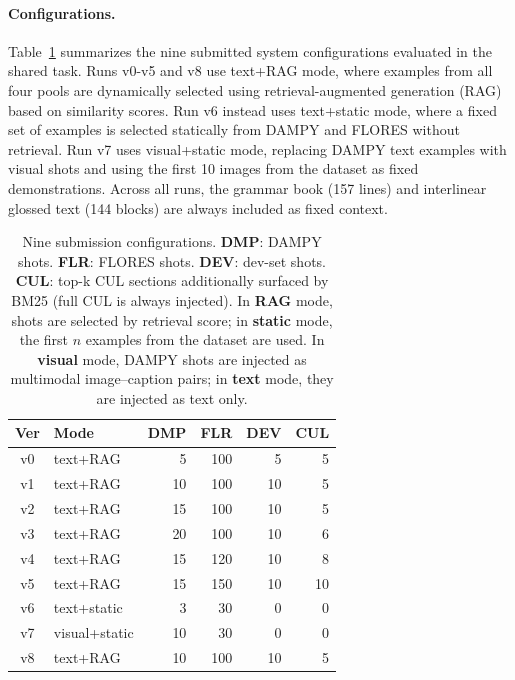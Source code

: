 \documentclass[11pt]{article}
\begin{document}
\paragraph{Configurations.}
Table~\ref{tab:configs} summarizes the nine submitted system configurations evaluated in the shared task. Runs v0-v5 and v8 use text+RAG mode, where examples from all four pools are dynamically selected using retrieval-augmented generation (RAG) based on similarity scores. Run v6 instead uses text+static mode, where a fixed set of examples is selected statically from DAMPY and FLORES without retrieval. Run v7 uses visual+static mode, replacing DAMPY text examples with visual shots and using the first 10 images from the dataset as fixed demonstrations. Across all runs, the grammar book (157 lines) and interlinear glossed text (144 blocks) are always included as fixed context.

\begin{table}[t]
\centering
\small
\setlength{\tabcolsep}{3pt}
\begin{tabular}{clrrrr}
\toprule
\textbf{Ver} & \textbf{Mode} & \textbf{DMP} & \textbf{FLR} & \textbf{DEV} & \textbf{CUL} \\
\midrule
v0 & text+RAG   &  5 & 100 &  5 &  5 \\
v1 & text+RAG   & 10 & 100 & 10 &  5 \\
v2 & text+RAG   & 15 & 100 & 10 &  5 \\
v3 & text+RAG   & 20 & 100 & 10 &  6 \\
v4 & text+RAG   & 15 & 120 & 10 &  8 \\
v5 & text+RAG   & 15 & 150 & 10 & 10 \\
v6 & text+static &  3 &  30 &  0 &  0 \\
v7 & visual+static & 10 & 30 & 0 & 0 \\
v8 & text+RAG   & 10 & 100 & 10 &  5 \\
\bottomrule
\end{tabular}
\caption{Nine submission configurations.
  \textbf{DMP}: DAMPY shots. \textbf{FLR}: FLORES shots.
  \textbf{DEV}: dev-set shots. \textbf{CUL}: top-k CUL sections additionally surfaced by BM25 (full CUL is always injected).
  In \textbf{RAG} mode, shots are selected by retrieval score; in
  \textbf{static} mode, the first $n$ examples from the dataset are used.
  In \textbf{visual} mode, DAMPY shots are injected as multimodal image--caption pairs; in \textbf{text} mode, they are injected as text only.}  \label{tab:configs}
\end{table}
\end{document}
